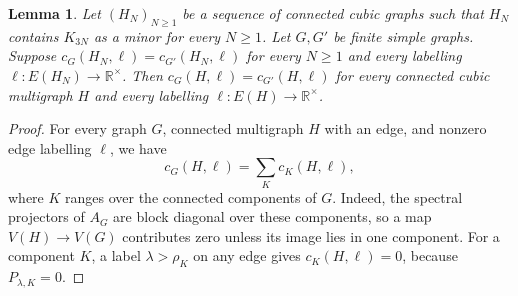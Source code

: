 \documentclass[11pt,a4paper]{article}
\theoremstyle{plain}
\newtheorem{lemma}[theorem]{Lemma}
\theoremstyle{definition}
\newcommand{\R}{\mathbb{R}}
\begin{document}
\begin{lemma}\label{lem:cubic-coefficient-transfer}
 Let $(H_N)_{N\geq1}$ be a sequence of connected cubic graphs such that
 $H_N$ contains $K_{3N}$ as a minor for every $N\geq1$.
 Let $G,G'$ be finite simple graphs. Suppose
 $c_G(H_N,\ell)=c_{G'}(H_N,\ell)$ for every $N\geq1$ and every
 labelling $\ell:E(H_N)\to\R^\times$.
 Then $c_G(H,\ell)=c_{G'}(H,\ell)$ for every connected cubic
 multigraph $H$ and every labelling $\ell:E(H)\to\R^\times$.
\end{lemma}
\begin{proof}
For every graph $G$, connected multigraph $H$ with an edge, and nonzero
edge labelling $\ell$, we have
\begin{equation}\label{eq:component-contributions}
 c_G(H,\ell)=\sum_K c_K(H,\ell),
\end{equation}
where $K$ ranges over the connected components of $G$.
Indeed, the spectral projectors of $A_G$ are block diagonal over these
components, so a map $V(H)\to V(G)$ contributes zero unless its image
lies in one component.
For a component $K$, a label $\lambda>\rho_K$ on any edge gives
$c_K(H,\ell)=0$, because $P_{\lambda,K}=0$.


\end{proof}
\end{document}
